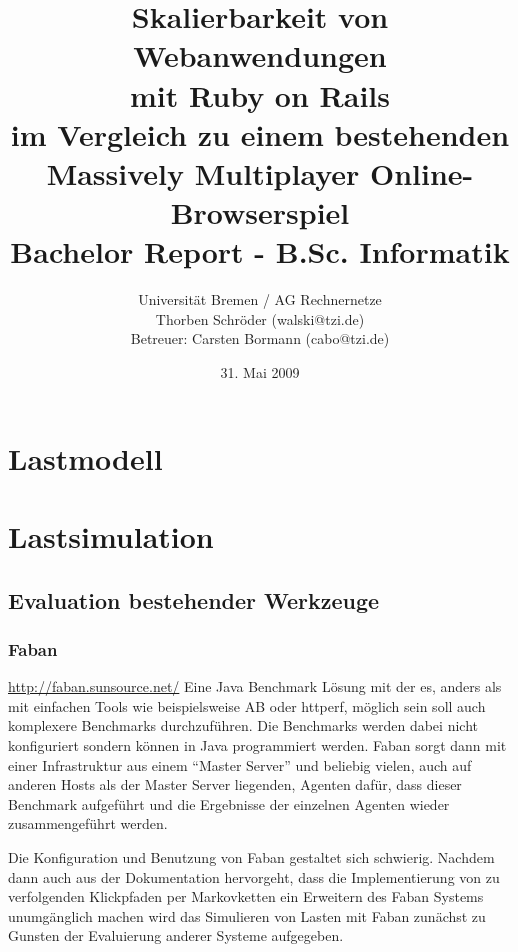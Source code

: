 \documentclass[1p]{scrartcl}
\title{Skalierbarkeit von Webanwendungen\\mit Ruby on Rails\\
\small{im Vergleich zu einem bestehenden\\Massively Multiplayer Online-Browserspiel}\\
\small{Bachelor Report - B.Sc. Informatik}\\
}
\author{Universität Bremen / AG Rechnernetze\\Thorben Schröder (walski@tzi.de)\\Betreuer: Carsten Bormann (cabo@tzi.de)}
\date{31. Mai 2009}
\begin{document}
\maketitle

\tableofcontents
\newpage

  \section{Lastmodell}
  \section{Lastsimulation}
  \subsection{Evaluation bestehender Werkzeuge}
  \subsubsection{Faban}
  \url{http://faban.sunsource.net/}
  Eine Java Benchmark Lösung mit der es, anders als mit einfachen Tools wie
  beispielsweise AB oder httperf, möglich sein soll auch komplexere Benchmarks
  durchzuführen. Die Benchmarks werden dabei nicht konfiguriert sondern können
  in Java programmiert werden. Faban sorgt dann mit einer Infrastruktur aus 
  einem ``Master Server'' und beliebig vielen, auch auf anderen Hosts als der
  Master Server liegenden, Agenten dafür, dass dieser Benchmark aufgeführt und
  die Ergebnisse der einzelnen Agenten wieder zusammengeführt werden.
  
  Die Konfiguration und Benutzung von Faban gestaltet sich schwierig. Nachdem 
  dann auch aus der Dokumentation hervorgeht, dass die Implementierung von
  zu verfolgenden Klickpfaden per Markovketten ein Erweitern des Faban Systems
  unumgänglich machen wird das Simulieren von Lasten mit Faban zunächst zu 
  Gunsten der Evaluierung anderer Systeme aufgegeben.
  
    
\end{document}
